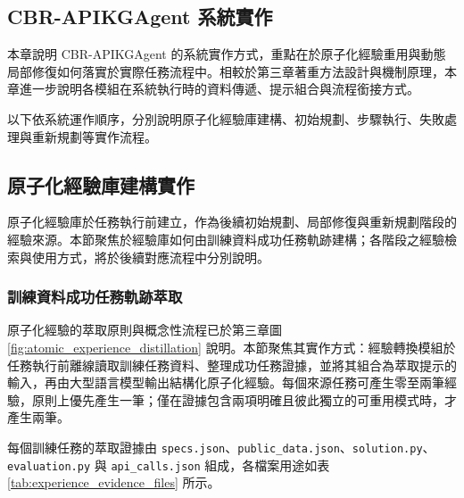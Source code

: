 \begin{ZhChapter}

\chapter{CBR-APIKGAgent 系統實作}

本章說明 CBR-APIKGAgent 的系統實作方式，重點在於原子化經驗重用與動態局部修復如何落實於實際任務流程中。相較於第三章著重方法設計與機制原理，本章進一步說明各模組在系統執行時的資料傳遞、提示組合與流程銜接方式。

以下依系統運作順序，分別說明原子化經驗庫建構、初始規劃、步驟執行、失敗處理與重新規劃等實作流程。

\section{原子化經驗庫建構實作}

原子化經驗庫於任務執行前建立，作為後續初始規劃、局部修復與重新規劃階段的經驗來源。本節聚焦於經驗庫如何由訓練資料成功任務軌跡建構；各階段之經驗檢索與使用方式，將於後續對應流程中分別說明。

\subsection{訓練資料成功任務軌跡萃取}

原子化經驗的萃取原則與概念性流程已於第三章圖 \ref{fig:atomic_experience_distillation} 說明。本節聚焦其實作方式：經驗轉換模組於任務執行前離線讀取訓練任務資料、整理成功任務證據，並將其組合為萃取提示的輸入，再由大型語言模型輸出結構化原子化經驗。每個來源任務可產生零至兩筆經驗，原則上優先產生一筆；僅在證據包含兩項明確且彼此獨立的可重用模式時，才產生兩筆。

每個訓練任務的萃取證據由 \texttt{specs.json}、\texttt{public\_data.json}、\texttt{solution.py}、\texttt{evaluation.py} 與 \texttt{api\_calls.json} 組成，各檔案用途如表 \ref{tab:experience_evidence_files} 所示。


\end{ZhChapter}
